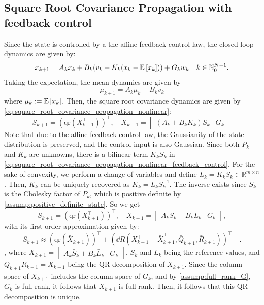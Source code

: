 \documentclass{IEEEtran}
\begin{document}
\subsection{Square Root Covariance Propagation with feedback control}
Since the state is controlled by a the affine feedback control law, the closed-loop dynamics are given by:
\begin{equation}
	x_{k+1} = A_k x_k + B_k (v_k + K_k (x_k - \mathbb{E}\left[x_k\right])) + G_k w_k \quad k \in \mathbb{N}_{0}^{N-1}.
\end{equation}
Taking the expectation, the mean dynamics are given by
\begin{equation} \label{eq:mean_dynamics}
	\mu_{k+1} = A_k \mu_k + B_k v_k
\end{equation}
where $\mu_k := \mathbb{E}\left[x_k\right]$.
Then, the square root covariance dynamics are given by \cref{eq:square_root_covariance_propagation_nonlinear}:
\begin{equation} \label{eq:square_root_covariance_propagation_nonlinear_feedback_control}
	S_{k+1} = (\mathrm{qr}(X_{k+1}^\top))^\top, \quad X_{k+1} = \begin{bmatrix} (A_k + B_k K_k) S_k & G_k \end{bmatrix}
\end{equation}
Note that due to the affine feedback control law, the Gaussianity of the state distribution is preserved, and the control input is also Gaussian.
Since both $P_k$ and $K_k$ are unknowns, there is a bilinear term \( K_k S_k \) in \cref{eq:square_root_covariance_propagation_nonlinear_feedback_control}.
For the sake of convexity, we perform a change of variables and define $L_k = K_k S_k \in \mathbb{R}^{m \times n}$. Then, $K_k$ can be uniquely recovered as $K_k = L_k S_k^{-1}$. The inverse exists since $S_k$ is the Cholesky factor of \( P_k \), which is positive definite by \cref{assump:positive_definite_state}.
So we get
\begin{equation} \label{eq:square_root_covariance_propagation}
	S_{k+1} = (\mathrm{qr}(X_{k+1}^\top))^\top, \quad X_{k+1} = \begin{bmatrix} A_k S_k + B_k L_k & G_k \end{bmatrix},
\end{equation}
with its first-order approximation given by:
\begin{equation} \label{eq:square_root_covariance_propagation_linearized}
	S_{k+1} \approx (\mathrm{qr}(\bar{X}_{k+1}^\top))^\top + \left( \dd R(X_{k+1}^\top - \bar{X}_{k+1}^\top, \bar{Q}_{k+1}, \bar{R}_{k+1}) \right)^\top \quad.
\end{equation}
, where \( \bar{X}_{k+1} = \begin{bmatrix} A_k \bar{S}_k + B_k \bar{L}_k & G_k \end{bmatrix} \), \(\bar{S}_k\) and \(\bar{L}_k\) being the reference values, and \(\bar{Q}_{k+1} \bar{R}_{k+1} = \bar{X}_{k+1}\) being the QR decomposition of \(\bar{X}_{k+1}\). Since the column space of \(X_{k+1}\) includes the column space of \(G_k\), and by \cref{assump:full_rank_G}, \(G_k\) is full rank, it follows that \(X_{k+1}\) is full rank. Then, it follows that this QR decomposition is unique.
\end{document}
